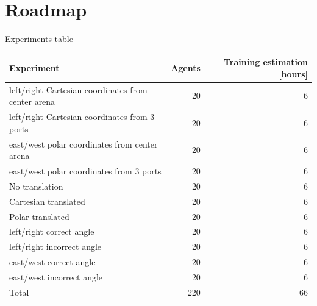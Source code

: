 \documentclass[bigger]{beamer}
\begin{document}
\section{Roadmap }
\label{sec:orge6da991}
\begin{frame}[label={sec:orga6192dd}]{Experiments table}
\scriptsize
\begin{center}
\begin{tabular}{lrr}
Experiment & Agents & Training estimation [hours]\\
\hline
left/right Cartesian coordinates from center arena & 20 & 6\\
left/right Cartesian coordinates from 3 ports & 20 & 6\\
east/west polar coordinates from center arena & 20 & 6\\
east/west polar coordinates from 3 ports & 20 & 6\\
\hline
No translation & 20 & 6\\
Cartesian translated & 20 & 6\\
Polar translated & 20 & 6\\
left/right correct angle & 20 & 6\\
left/right incorrect angle & 20 & 6\\
east/west correct angle & 20 & 6\\
east/west incorrect angle & 20 & 6\\
\hline
Total & 220 & 66\\
\end{tabular}
\end{center}
\end{frame}
\end{document}
